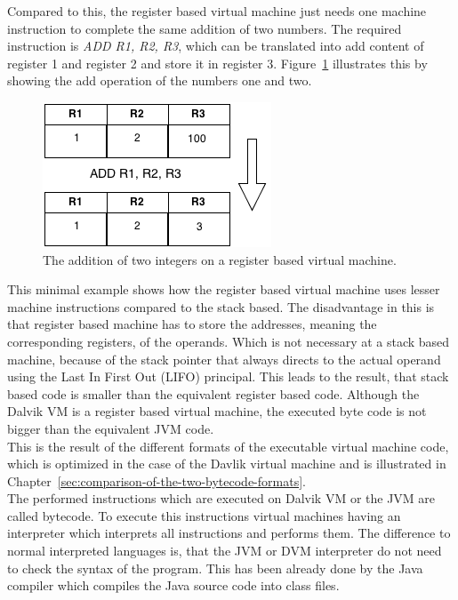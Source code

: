 Compared to this, the register based virtual machine just needs one machine instruction to complete the same addition of two numbers.
The required instruction is \textit{ADD R1, R2, R3}, which can be translated into add content of register 1 and register 2 and store it in register 3.
Figure~\ref{fig:register-based-addition} illustrates this by showing the add operation of the numbers one and two.
\begin{figure}[h]
\begin{center}
\includegraphics[scale=0.65]{images/register-based-addition.png} 
\caption{The addition of two integers on a register based virtual machine.}
\label{fig:register-based-addition}
\end{center}
\end{figure}
This minimal example shows how the register based virtual machine uses lesser machine instructions compared to the stack based.
The disadvantage in this is that register based machine has to store the addresses, meaning the corresponding registers, of the operands.
Which is not necessary at a stack based machine, because of the stack pointer that always directs to the actual operand using the Last In First Out (LIFO) principal.
This leads to the result, that stack based code is smaller than the equivalent register based code.
Although the Dalvik VM is a register based virtual machine, the executed byte code is not bigger than the equivalent JVM code.~\cite{shi2008virtual}\\
This is the result of the different formats of the executable virtual machine code, which is optimized in the case of the Davlik virtual machine and is illustrated in Chapter~\ref{sec:comparison-of-the-two-bytecode-formats}.
\\
The performed instructions which are executed on Dalvik VM or the JVM are called bytecode.
To execute this instructions virtual machines having an interpreter which interprets all instructions and performs them.
The difference to normal interpreted languages is, that the JVM or DVM interpreter do not need to check the syntax of the program.
This has been already done by the Java compiler which compiles the Java source code into class files.

